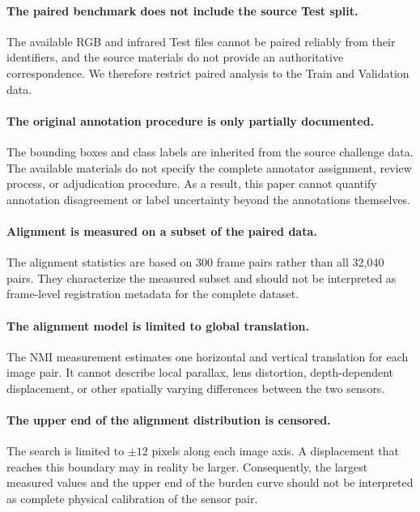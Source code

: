 \documentclass[10pt]{article}
\begin{document}
\paragraph{The paired benchmark does not include the source Test split.}
The available RGB and infrared Test files cannot be paired reliably from their identifiers, and the source materials do not provide an authoritative correspondence. We therefore restrict paired analysis to the Train and Validation data.

\paragraph{The original annotation procedure is only partially documented.}
The bounding boxes and class labels are inherited from the source challenge data. The available materials do not specify the complete annotator assignment, review process, or adjudication procedure. As a result, this paper cannot quantify annotation disagreement or label uncertainty beyond the annotations themselves.

\paragraph{Alignment is measured on a subset of the paired data.}
The alignment statistics are based on 300 frame pairs rather than all 32,040 pairs. They characterize the measured subset and should not be interpreted as frame-level registration metadata for the complete dataset.

\paragraph{The alignment model is limited to global translation.}
The NMI measurement estimates one horizontal and vertical translation for each image pair. It cannot describe local parallax, lens distortion, depth-dependent displacement, or other spatially varying differences between the two sensors.

\paragraph{The upper end of the alignment distribution is censored.}
The search is limited to $\pm12$ pixels along each image axis. A displacement that reaches this boundary may in reality be larger. Consequently, the largest measured values and the upper end of the burden curve should not be interpreted as complete physical calibration of the sensor pair.
\end{document}
